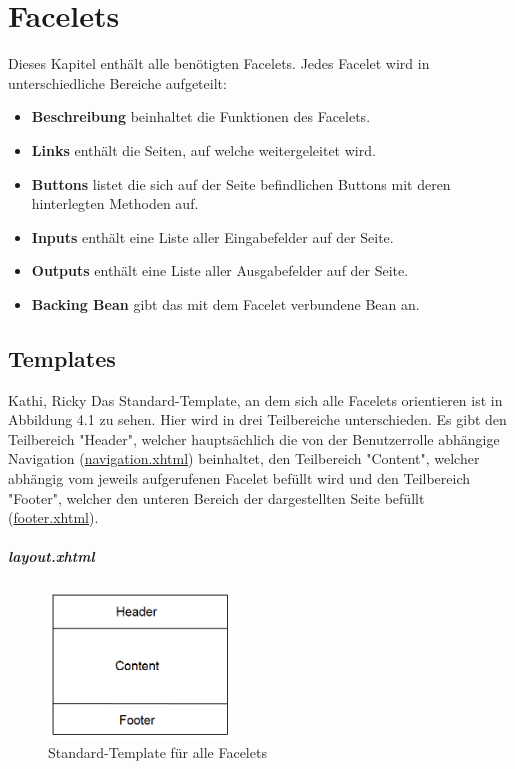\chapter{Facelets}

	Dieses Kapitel enthält alle benötigten  Facelets. Jedes Facelet wird in unterschiedliche  Bereiche aufgeteilt:
	\begin{itemize}
		\item \textbf{Beschreibung} beinhaltet die Funktionen des Facelets.
		\item \textbf{Links} enthält die Seiten, auf welche weitergeleitet wird.
		\item \textbf{Buttons} listet die sich auf der Seite befindlichen Buttons mit deren hinterlegten Methoden auf.
		\item \textbf{Inputs} enthält eine Liste aller Eingabefelder auf der Seite.
		\item \textbf{Outputs} enthält eine Liste aller Ausgabefelder auf der Seite.
		\item \textbf{Backing Bean} gibt das mit dem Facelet verbundene Bean an.
	\end{itemize}
	
	\section{Templates}
		Kathi, Ricky
		Das Standard-Template, an dem sich alle Facelets orientieren ist in Abbildung 4.1 zu sehen. Hier wird in drei Teilbereiche unterschieden. Es gibt den Teilbereich "Header", welcher hauptsächlich die von der Benutzerrolle abhängige Navigation (\hyperlink{navigation}{navigation.xhtml}) beinhaltet, den Teilbereich "Content", welcher abhängig vom jeweils aufgerufenen Facelet befüllt wird und den Teilbereich "Footer", welcher den unteren Bereich der dargestellten Seite befüllt (\hyperlink{footer}{footer.xhtml}).
	
		\paragraph{layout.xhtml}
			\begin{figure}[h]
				\centering
				\includegraphics[width=0.435\textwidth, angle=0]{Grafiken/Template.png}
	  			\caption{Standard-Template für alle Facelets}
			\end{figure}

